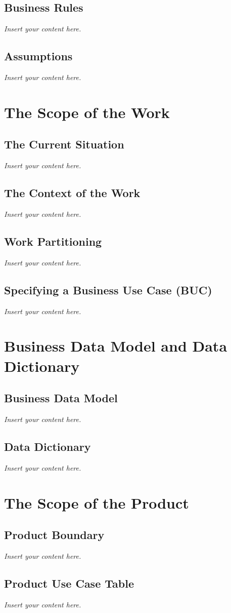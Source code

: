 \documentclass[12pt]{article}
\newcommand{\lips}{\textit{Insert your content here.}}
\begin{document}
\subsection{Business Rules}
\lips
\subsection{Assumptions}
\lips

\section{The Scope of the Work}
\subsection{The Current Situation}
\lips
\subsection{The Context of the Work}
\lips
\subsection{Work Partitioning}
\lips
\subsection{Specifying a Business Use Case (BUC)}
\lips

\section{Business Data Model and Data Dictionary}
\subsection{Business Data Model}
\lips
\subsection{Data Dictionary}
\lips

\section{The Scope of the Product}
\subsection{Product Boundary}
\lips
\subsection{Product Use Case Table}
\lips
\end{document}
